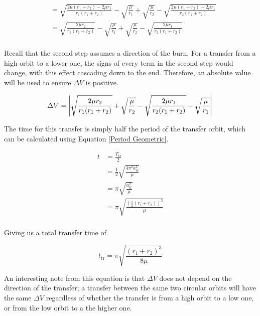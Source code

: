 \documentclass{article}
\begin{document}
\begin{align*}
             & = \sqrt{\frac{2\mu(r_1+r_2)-2\mu{}r_1}{r_1(r_1+r_2)}}-\sqrt{\frac{\mu}{r_1}}+\sqrt{\frac{\mu}{r_2}}-\sqrt{\frac{2\mu(r_1+r_2)-2\mu{}r_1}{r_2(r_1+r_2)}}                                                                           \\
             & = \sqrt{\frac{2\mu{}r_2}{r_1(r_1+r_2)}}-\sqrt{\frac{\mu}{r_1}}+\sqrt{\frac{\mu}{r_2}}-\sqrt{\frac{2\mu{}r_1}{r_2(r_1+r_2)}}                                                                                                       \\
\end{align*}

Recall that the second step assumes a direction of the burn. For a transfer from a high orbit to a lower one, the signs of every term in the second step would change, with this effect cascading down to the end. Therefore, an absolute value will be used to ensure $\Delta V$ is positive.

\begin{equation}
    \Delta V = \left|\sqrt{\frac{2\mu{}r_2}{r_1(r_1+r_2)}}+\sqrt{\frac{\mu}{r_2}}-\sqrt{\frac{2\mu{}r_1}{r_2(r_1+r_2)}}-\sqrt{\frac{\mu}{r_1}}\right|\\
\end{equation}

The time for this transfer is simply half the period of the transfer orbit, which can be calculated using Equation \eqref{Period Geometric}.

\begin{align*}
    t & = \frac{T_\text{tr}}{2}                                     \\
      & = \frac{1}{2}\sqrt{\frac{4\pi^2 a_\text{tr}^3}{\mu}}        \\
      & = \pi\sqrt{\frac{a_\text{tr}^3}{\mu}}                       \\
      & = \pi\sqrt{\frac{\left(\frac{1}{2}(r_1+r_2)\right)^3}{\mu}} \\
\end{align*}

Giving us a total transfer time of

\begin{equation}\label{Hohmann time}
    t_\text{tr}=\pi\sqrt{\frac{(r_1+r_2)^3}{8\mu}}
\end{equation}

An interesting note from this equation is that $\Delta V$ does not depend on the direction of the transfer; a transfer between the same two circular orbits will have the same $\Delta V$ regardless of whether the transfer is from a high orbit to a low one, or from the low orbit to a the higher one.
\end{document}
